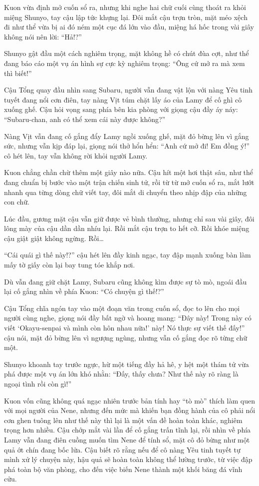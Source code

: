 \documentclass[../main.tex]{subfiles}
\begin{document}
Kuon vừa định mở cuốn sổ ra, nhưng khi nghe hai chữ cuối cùng thoát ra khỏi miệng Shunyo, tay cậu lập tức khựng lại. Đôi mắt cậu trợn tròn, mặt méo xệch đi như thể vừa bị ai đó ném một cục đá lớn vào đầu, miệng há hốc trong vài giây không nói nên lời: ``Hả!?''

Shunyo gật đầu một cách nghiêm trọng, mặt không hề có chút đùa cợt, như thể đang báo cáo một vụ án hình sự cực kỳ nghiêm trọng: ``Ông cứ mở ra mà xem thì biết!''

Cậu Tổng quay đầu nhìn sang Subaru, người vẫn đang vật lộn với nàng Yêu tinh tuyết đang nổi cơn điên, tay nàng Vịt túm chặt lấy áo của Lamy để cố ghì cô xuống ghế. Cậu hỏi vọng sang phía bên kia phòng với giọng cậu đầy áy náy: ``Subaru-chan, anh có thể xem cái này được không?''

Nàng Vịt vẫn đang cố gắng đẩy Lamy ngồi xuống ghế, mặt đỏ bừng lên vì gắng sức, nhưng vẫn kịp đáp lại, giọng nói thở hổn hển: ``Anh cứ mở đi! Em đồng ý!'' cô hét lên, tay vẫn không rời khỏi người Lamy.

Kuon chẳng chần chừ thêm một giây nào nữa. Cậu hít một hơi thật sâu, như thể đang chuẩn bị bước vào một trận chiến sinh tử, rồi từ từ mở cuốn sổ ra, mắt lướt nhanh qua từng dòng chữ viết tay, đôi mắt di chuyển theo nhịp đập của những con chữ.

Lúc đầu, gương mặt cậu vẫn giữ được vẻ bình thường, nhưng chỉ sau vài giây, đôi lông mày của cậu dần dần nhíu lại. Rồi mắt cậu trợn to hết cỡ. Rồi khóe miệng cậu giật giật không ngừng. Rồi\dots

``Cái quái gì thế này!?'' cậu hét lên đầy kinh ngạc, tay đập mạnh xuống bàn làm mấy tờ giấy còn lại bay tung tóe khắp nơi.

Dù vẫn đang giữ chặt Lamy, Subaru cũng không kìm được sự tò mò, ngoái đầu lại cố gắng nhìn về phía Kuon: ``Có chuyện gì thế!?''

Cậu Tổng chĩa ngón tay vào một đoạn văn trong cuốn sổ, đọc to lên cho mọi người cùng nghe, giọng nói đầy bất ngờ và hoang mang: ``Đây này! Trong này có viết `Okayu-senpai và mình còn hôn nhau nữa!' này! Nó thực sự viết thế đấy!'' cậu nói, mặt đỏ bừng lên vì ngượng ngùng, nhưng vẫn cố gắng đọc rõ từng chữ một.

Shunyo khoanh tay trước ngực, hừ một tiếng đầy hả hê, y hệt một thám tử vừa phá được một vụ án lớn khó nhằn: ``Đấy, thấy chưa? Như thế này rõ ràng là ngoại tình rồi còn gì!''

Kuon vốn cũng không quá ngạc nhiên trước bản tính hay ``tò mò'' thích làm quen với mọi người của Nene, nhưng đến mức mà khiến bạn đồng hành của cô phải nổi cơn ghen tuông lên như thế này thì lại là một vấn đề hoàn toàn khác, nghiêm trọng hơn nhiều. Cậu chớp mắt vài lần để cố gắng trấn tĩnh lại, rồi nhìn về phía Lamy vẫn đang điên cuồng muốn tìm Nene để tính sổ, mặt cô đỏ bừng như một quả ớt chín đang bốc lửa. Cậu biết rõ rằng nếu để cô nàng Yêu tinh tuyết tự mình xử lý chuyện này, hậu quả sẽ hoàn toàn không thể lường trước, từ việc đập phá toàn bộ văn phòng, cho đến việc biến Nene thành một khối băng đá vĩnh cửu.
\end{document}
